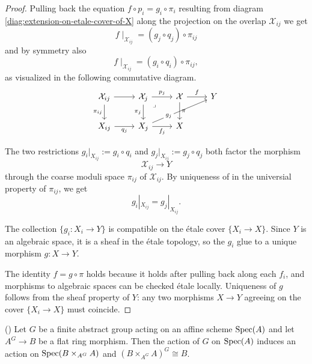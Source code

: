 \begin{proof}
	Pulling back the equation $f\circ p_i = g_i \circ \pi_i$ resulting from diagram \ref{diag:extension-on-etale-cover-of-X} along the projection on the overlap $\mathcal{X}_{ij}$ we get 
	\[
	f\mid_{\mathcal{X}_{ij}} = (g_j \circ q_j) \circ \pi_{ij}
	\] and by symmetry also
	\[
	f\mid_{\mathcal{X}_{ij}} = (g_i \circ q_i) \circ \pi_{ij},
	\]
	as visualized in the following commutative diagram.
	\[\begin{tikzcd}
		{\mathcal{X}_{ij}} & {\mathcal{X}_j} & {\mathcal{X}} & Y \\
		{X_{ij}} & {X_j} & X
		\arrow[from=1-1, to=1-2]
		\arrow["{\pi_{ij}}"', from=1-1, to=2-1]
		\arrow["{p_j}", from=1-2, to=1-3]
		\arrow["{\pi_j}"', from=1-2, to=2-2]
		\arrow["\lrcorner"{anchor=center, pos=0.125}, draw=none, from=1-2, to=2-3]
		\arrow["f", from=1-3, to=1-4]
		\arrow["\pi", from=1-3, to=2-3]
		\arrow["{q_j}"', from=2-1, to=2-2]
		\arrow["{g_j}"{description, pos=0.3}, from=2-2, to=1-4]
		\arrow["{f_j}"', from=2-2, to=2-3]
	\end{tikzcd}\]
	
	
	The two restrictions $g_i|_{X_{ij}} := g_i\circ q_i$ and $g_j|_{X_{ij}} := g_j \circ q_j$ both
	factor the morphism
	\[
	\mathcal{X}_{ij} \longrightarrow Y
	\]
	through the coarse moduli space $\pi_{ij}$ of $\mathcal{X}_{ij}$. By uniqueness of in the universial property of $\pi_{ij}$, we get
	\[
	g_i|_{X_{ij}} = g_j|_{X_{ij}}.
	\]
	
	The collection $\{g_i : X_i \to Y\}$ is compatible on the étale
	cover $\{X_i \to X\}$. Since $Y$ is an algebraic space, it is a
	sheaf in the étale topology, so the $g_i$ glue to a unique morphism
	$g : X \to Y$.
	
	
	The identity $f = g \circ \pi$ holds because it holds after pulling back
	along each $f_i$, and morphisms to algebraic spaces can be checked étale
	locally. Uniqueness of $g$ follows from the sheaf property of $Y$: any
	two morphisms $X \to Y$ agreeing on the cover $\{X_i \to X\}$ must
	coincide.
\end{proof}


\begin{lemma}\label{lem:invariants-flat-base-change}
	(\cite[Lemma 5.2.7]{alper2026stacks})
	Let $G$ be a finite abstract group acting on an affine scheme $\operatorname{Spec}\!\left(A\right)$ and let $A^G \to B$ be a flat ring morphism. Then the action of $G$ on $\operatorname{Spec}\!\left(A\right)$ induces an action on $\operatorname{Spec}(B\times_{A^G} A)$ and $(B\times_{A^G} A)^G \cong B$.
\end{lemma}


